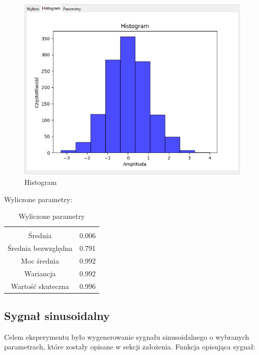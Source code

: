 \documentclass{article}
\begin{document}
        \begin{figure}[h!]
            \centering
            \includegraphics[width=\textwidth]{img/szum-gauss/hist.png}
            \caption{Histogram}
        \end{figure}
        \FloatBarrier
        Wyliczone parametry:
        \begin{table}[h!]
            \centering
            \vspace{0.2cm}
            \begin{tabular}{|c|c|}
                \hline\hline\\[-0.4cm]
                Średnia & 0.006  \\
                \hline
                Średnia bezwzględna & 0.791  \\
                \hline
                Moc średnia & 0.992  \\
                \hline
                Wariancja & 0.992 \\
                \hline
                Wartość skuteczna & 0.996 \\
                \hline
            \end{tabular}
            \caption{Wyliczone parametry}
            \label{szumgaussowski}
        \end{table}

\subsection{Sygnał sinusoidalny} \label{sinus} 
Celem eksperymentu było wygenerowanie sygnału sinusoidalnego o wybranych parametrach,
które zostały opisane w sekcji założenia. Funkcja opisująca sygnał:
\end{document}

